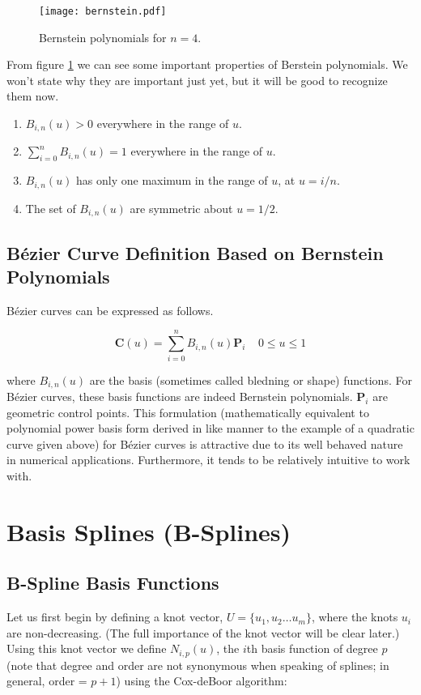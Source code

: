 \begin{figure}[htbp]
	\centering
	\texttt{[image: bernstein.pdf]}
	\caption{Bernstein polynomials for $n=4$.}
	\label{fig:bernstein}
\end{figure}

From figure \ref{fig:bernstein} we can see some important properties of Berstein polynomials. We won't state why they are important just yet, but it will be good to recognize them now.

\begin{enumerate}
	\item $B_{i,n}(u) > 0$ everywhere in the range of $u$.
	\item $\sum_{i=0}^n B_{i,n}(u) = 1$ everywhere in the range of $u$.
	\item $B_{i,n}(u)$ has only one maximum in the range of $u$, at $u=i/n$.
	\item The set of  $B_{i,n}(u)$ are symmetric about $u=1/2$.
\end{enumerate}

\subsection{Bézier Curve Definition Based on Bernstein Polynomials}

Bézier curves can be expressed as follows.

\begin{equation} \textbf{C}(u) = \sum^n_{i=0}B_{i,n}(u) \textbf{P}_i~~~~~0\leq u \leq1 \end{equation}

where $B_{i,n}(u)$ are the basis (sometimes called bledning or shape) functions. For Bézier curves, these basis functions are indeed Bernstein polynomials. \(\textbf{P}_i\) are geometric control points.  This formulation (mathematically equivalent to polynomial power basis form derived in like manner to the example of a quadratic curve given above) for Bézier curves is attractive due to its well behaved nature in numerical applications. Furthermore, it tends to be relatively intuitive to work with.

\section{Basis Splines (B-Splines)}

\subsection{B-Spline Basis Functions}
Let us first begin by defining a knot vector, $U = \{u_1, u_2  \ldots u_{m}\}$, where the knots $u_i$ are non-decreasing.  (The full importance of the knot vector will be clear later.) Using this knot vector we define $N_{i,p}(u)$, the $i$th basis function of degree $p$ (note that degree and order are not synonymous when speaking of splines; in general, order = $p+1$) using the Cox-deBoor algorithm:


